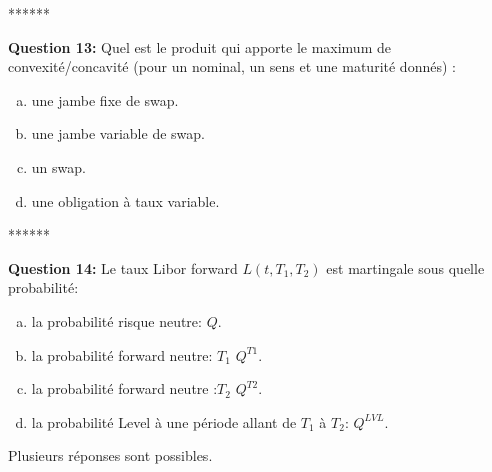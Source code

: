 \documentclass{article}
\newcommand{\indentitem}{\setlength\itemindent{25pt}}
\begin{document}
\smallskip
\centerline{******}
\smallskip
\textbf{Question 13:}
Quel est le produit qui apporte le maximum de convexité/concavité (pour un nominal, un sens et une maturité donnés) : 
\begin{enumerate}[a)]
\indentitem \item une jambe fixe de swap.
\indentitem \item une jambe variable de swap.
\indentitem \item un swap.
\indentitem \item une obligation à taux variable.
\end{enumerate}
\smallskip
\centerline{******}
\smallskip
\textbf{Question 14:}
Le taux Libor forward $L(t,T_1,T_2)$ est martingale sous quelle probabilité:
\begin{enumerate}[a)]
\indentitem \item la probabilité risque neutre: $Q$.
\indentitem \item la probabilité forward neutre: $T_1$ $Q^{T1}$.
\indentitem \item la probabilité forward neutre :$T_2$ $Q^{T2}$.
\indentitem \item la probabilité Level à une période allant de $T_1$ à $T_2$: $Q^{LVL}$.
\end{enumerate}
Plusieurs réponses sont possibles.
\end{document}
